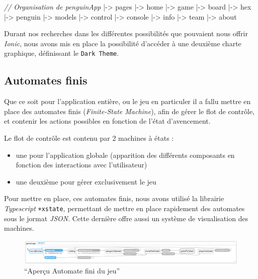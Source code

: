 \documentclass[a4paper,11pt]{article}
\newenvironment{Shaded}{}{}
\newcommand{\CommentTok}[1]{\textit{#1}}
\newcommand{\NormalTok}[1]{#1}
\providecommand{\tightlist}{%
  \setlength{\itemsep}{0pt}\setlength{\parskip}{0pt}}
\begin{document}
\begin{Shaded}
\begin{Highlighting}[numbers=left,,firstnumber=0,]
\CommentTok{// Organisation de penguinApp}
\NormalTok{|-> pages}
\NormalTok{    |-> home}
\NormalTok{    |-> game}
\NormalTok{        |-> board}
\NormalTok{            |-> hex}
\NormalTok{            |-> penguin}
\NormalTok{            |-> models}
\NormalTok{        |-> control}
\NormalTok{        |-> console}
\NormalTok{        |-> info}
\NormalTok{     |-> team}
\NormalTok{     |-> about}
\end{Highlighting}
\end{Shaded}

Durant nos recherches dans les différentes possibilités que pouvaient
nous offrir \emph{Ionic}, nous avons mis en place la possibilité
d'accéder à une deuxième charte graphique, définissant le
\texttt{Dark\ Theme}.

\subsection{Automates finis}\label{automates-finis}

Que ce soit pour l'application entière, ou le jeu en particuler il a
fallu mettre en place des automates finis (\emph{Finite-State Machine}),
afin de gérer le flot de contrôle, et contenir les actions possibles en
fonction de l'état d'avencement.

Le flot de contrôle est contenu par 2 machines à états :

\begin{itemize}
\tightlist
\item
  une pour l'application globale (apparition des différents composants
  en fonction des interactions avec l'utilisateur)
\item
  une deuxième pour gérer exclusivement le jeu
\end{itemize}

Pour mettre en place, ces automates finis, nous avons utilisé la
librairie \emph{Typescript} \texttt{+xstate}, permettant de mettre en
place rapidement des automates sous le jormat \emph{JSON}. Cette
dernière offre aussi un système de visualisation des machines.

\begin{figure}
\centering
\includegraphics{gameMachine.png}
\caption{``Aperçu Automate fini du jeu''}
\end{figure}
\end{document}
